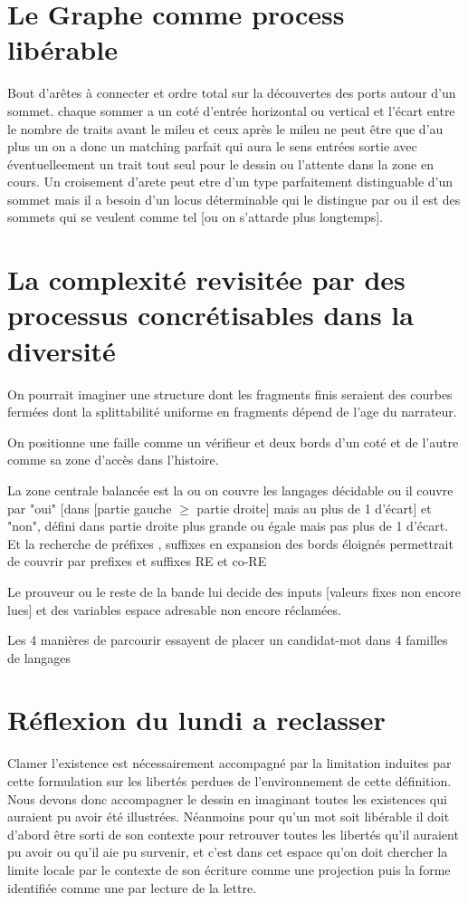 \documentclass{article}
\begin{document}
\section{Le Graphe comme process libérable}
Bout d'arêtes à connecter et ordre total sur la découvertes des ports autour d'un sommet. chaque sommer a un coté d'entrée horizontal ou vertical 
et l'écart entre le nombre de traits avant le mileu et ceux après le mileu ne peut être que d'au plus un on a donc un matching parfait qui aura le sens entrées sortie avec éventuelleement un trait tout seul pour le dessin ou l'attente dans la zone en cours.
Un croisement d'arete peut etre d'un type parfaitement distinguable d'un sommet mais il a besoin d'un locus déterminable qui le distingue par ou il est des sommets qui se veulent comme tel [ou on s'attarde plus longtemps].
  
\section{La complexité revisitée par des processus concrétisables dans la diversité}
On pourrait imaginer une structure dont les fragments finis seraient des courbes fermées dont la splittabilité uniforme en fragments dépend de l'age du narrateur.

On positionne une faille comme un vérifieur et deux bords d'un coté et de l'autre comme sa zone d'accès dans l'histoire.

La zone centrale balancée est la ou on couvre les langages décidable ou il couvre par "oui" [dans [partie gauche $\ge$ partie droite] mais au plus de 1 d'écart] et "non", défini dans partie droite plus grande ou égale mais pas plus de 1 d'écart. 
Et la recherche de préfixes , suffixes en expansion des bords éloignés permettrait de couvrir par prefixes et suffixes RE et co-RE 

Le prouveur ou le reste de la bande lui decide des inputs [valeurs fixes non encore lues] et des variables espace adresable non encore réclamées.

Les 4 manières de parcourir essayent de placer  un candidat-mot dans  4 familles de langages
\section{Réflexion du lundi a reclasser}
Clamer l'existence est nécessairement accompagné par la limitation induites par cette formulation sur les libertés perdues de l'environnement de cette définition. 
Nous devons donc accompagner le dessin en imaginant toutes les existences qui auraient pu avoir été illustrées. 
Néanmoins pour qu'un mot soit libérable il doit d'abord être sorti de son contexte pour retrouver toutes les libertés qu'il auraient pu avoir ou qu'il aie pu survenir, et c'est dans cet espace qu'on doit chercher la limite locale par le contexte de son écriture comme une projection puis la forme identifiée comme une par lecture de la lettre. 
\end{document}

